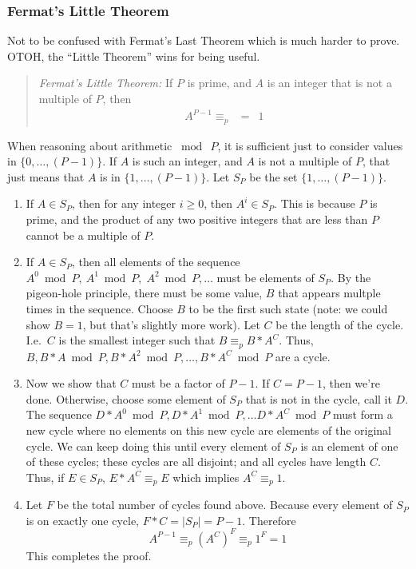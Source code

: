 \documentclass{article}
\newcommand{\equivp}{\equiv_p}
\begin{document}
\subsubsection{Fermat's Little Theorem}\label{sec:flt}
  Not to be confused  with Fermat's Last Theorem which is much harder to prove.
  OTOH, the ``Little Theorem'' wins for being useful.
  \begin{quote}
    \emph{Fermat's Little Theorem:}
    If $P$ is prime, and $A$ is an integer that is not a multiple of $P$, then
    \begin{displaymath}\begin{array}{lrcl}
      A^{P-1} \equivp &=& 1
    \end{array}\end{displaymath}
  \end{quote}
  When reasoning about arithmetic $\bmod~P$, it is sufficient just to consider values in $\{0, \ldots, (P-1)\}$.
  If $A$ is such an integer, and $A$ is not a multiple of $P$, that just means that $A$ is in $\{1, \ldots, (P-1)\}$.
  Let $S_P$ be the set $\{1, \ldots, (P-1)\}$.
  \begin{enumerate}
    \item If $A \in S_P$, then for any integer $i \geq 0$, then $A^i \in S_P$.
      This is because $P$ is prime, and the product of any two positive integers that are less than $P$ cannot be
      a multiple of $P$.
    \item If $A \in S_P$, then all elements of the sequence $A^0 \bmod P,\ A^1 \bmod P,\; A^2 \bmod P, \ldots$
      must be elements of $S_P$.  By the pigeon-hole principle, there must be some value, $B$ that appears
      multple times in the sequence.  Choose $B$ to be the first such state (note: we could show $B = 1$, but
      that's slightly more work).  Let $C$ be the length of the cycle.  I.e.\ $C$ is the smallest integer
      such that $B \equivp B*A^C$.  Thus, $B, B*A \bmod P, B*A^2 \bmod P, \ldots, B*A^C \bmod P$ are a cycle.
    \item Now we show that $C$ must be a factor of $P-1$.  If $C = P-1$, then we're done.
      Otherwise, choose some element of $S_P$ that is not in the cycle, call it $D$.
      The sequence $D*A^0 \bmod P, D*A^1 \bmod P, \ldots D*A^C \bmod P$ must form a new cycle where
      no elements on this new cycle are elements of the original cycle.
      We can keep doing this until every element of $S_P$ is an element of one of these cycles;
      these cycles are all disjoint; and all cycles have length $C$.
      Thus, if $E \in S_P$, $E*A^C \equivp E$ which implies $A^C \equivp 1$.
    \item Let $F$ be the total number of cycles found above.  Because every element of $S_P$ is on exactly
      one cycle, $F*C = |S_P| = P-1$.  Therefore
      \begin{displaymath}
	A^{P-1} \equivp \left(A^C\right)^F \equivp 1^F = 1
      \end{displaymath}
      This completes the proof.
  \end{enumerate}
\end{document}
